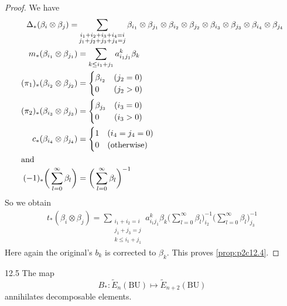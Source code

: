 \documentclass[../main]{subfiles}
\begin{document}
\begin{proof}
We have
\begin{align*}
\Delta_\ast(\beta_i\otimes\beta_j) = &\sum_{\substack{i_1+i_2+i_3+i_4=i\\ j_1+j_2+j_3+j_4=j}} \beta_{i_1}\otimes\beta_{j_1}\otimes\beta_{i_2}\otimes\beta_{j_2}\otimes\beta_{i_3}\otimes\beta_{j_3}\otimes\beta_{i_4}\otimes\beta_{j_4}\\
m_\ast(\beta_{i_1}\otimes\beta_{j_1})&= \sum_{k\le i_1+j_1}a^k_{{i_1}{j_1}}\beta_k\\
(\pi_1)_\ast(\beta_{i_2}\otimes\beta_{j_2}) &= \begin{cases}\beta_{i_2}&(j_2=0)\\0&(j_2>0)\end{cases}\\
(\pi_2)_\ast(\beta_{i_3}\otimes\beta_{j_3}) &= \begin{cases}\beta_{j_3}&(i_3=0)\\0&(i_3>0)\end{cases}\\
c_\ast(\beta_{i_4}\otimes\beta_{j_4}) &= \begin{cases}1 & (i_4=j_4=0)\\0&(\text{otherwise})\end{cases}\\
\intertext{and}
(-1)_\ast\bigg(\sum^\infty_{l=0} \beta_l\bigg) &= \bigg(\sum^\infty_{l=0} \beta_l\bigg)^{-1}
\end{align*}
So we obtain
\begin{align*}
t_\ast(\beta_{i}\otimes\beta_{j}) = \sum_{\substack{i_1+i_2=i\\ j_1+j_3=j\\k\le i_1+j_1}} a^k_{{i_1}{j_1}} \beta_k \bigg(\sum^\infty_{l=0}\beta_l\bigg)_{i_2}^{-1} \bigg(\sum^\infty_{l=0} \beta_l\bigg)^{-1}_{j_3}
\end{align*}
Here again the original's $b_k$ is corrected to $\beta_k$.
This proves \eqref{prop:p2c12.4}.
\end{proof}
\begin{customprop}{12.5}
\label{prop:p2c12.5}
The map \[B_\ast:\widetilde{E}_n(\mathrm{BU}) \mapsto \widetilde{E}_{n+2}(\mathrm{BU})\] annihilates decomposable elements. 
\end{customprop}
\end{document}
